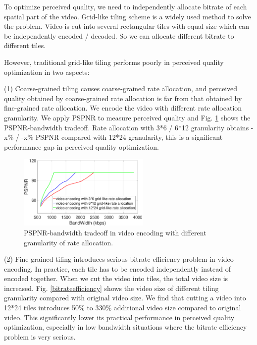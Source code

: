 To optimize perceived quality, we need to independently allocate bitrate of each spatial part of the video. Grid-like tiling scheme is a widely used method to solve the problem. Video is cut into several rectangular tiles with equal size which can be independently encoded / decoded. So we can allocate different bitrate to different tiles.

However, traditional grid-like tiling performs poorly in perceived quality optimization in two aspects: 

(1) Coarse-grained tiling causes coarse-grained rate allocation, and perceived quality obtained by coarse-grained rate allocation is far from that obtained by fine-grained rate allocation. We encode the video with different rate allocation granularity. We apply PSPNR to measure perceived quality and Fig. \ref{optimalencoding} shows the PSPNR-bandwidth tradeoff. Rate allocation with 3*6 / 6*12 granularity obtains -x\% / -x\% PSPNR compared with 12*24 granularity, this is a significant performance gap in perceived quality optimization.

\begin{figure}
  \centering
  \includegraphics[width=2.5in]{images/optimalencoding.eps}
  \caption{PSPNR-bandwidth tradeoff in video encoding with different granularity of rate allocation.}
  \label{optimalencoding}
  \end{figure}

(2) Fine-grained tiling introduces serious bitrate efficiency problem in video encoding. In practice, each tile has to be encoded independently instead of encoded together. When we cut the video into tiles, the total video size is increased. Fig. \ref{bitrateefficiency} shows the video size of different tiling granularity compared with original video size. We find that cutting a video into 12*24 tiles introduces 50\% to 330\% additional video size compared to original video. This significantly lower its practical performance in perceived quality optimization, especially in low bandwidth situations where the bitrate efficiency problem is very serious.


